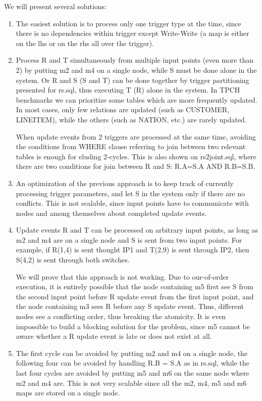 \documentclass{sig-semester}
\begin{document}
We will present several solutions:
\begin{enumerate}
\item The easiest solution is to process only one trigger type at the time, since there is no dependencies within trigger except Write-Write (a map is either on the lhs or on the rhs all over the trigger).
\item Process R and T simultaneously from multiple input points (even more than 2) by putting m2 and m4 on a single node, while S must be done alone in the system. Or R and S (S and T) can be done together by trigger partitioning presented for rs.sql, thus executing T (R) alone in the system. In TPCH benchmarks we can prioritize some tables which are more frequently updated. In most cases, only few relations are updated (such as CUSTOMER, LINEITEM), while the others (such as NATION, etc.) are rarely updated.

When update events from 2 triggers are processed at the same time, avoiding the conditions from WHERE clause referring to join between two relevant tables is enough for eluding 2-cycles. This is also shown on rs2joint.sql, where there are two conditions for join between R and S: R.A=S.A AND R.B=S.B.

\item An optimization of the previous approach is to keep track of currently processing trigger parameters, and let S in the system only if there are no conflicts. This is not scalable, since input points have to communicate with nodes and among themselves about completed update events.
\item Update events R and T can be processed on arbitrary input points, as long as m2 and m4 are on a single node and S is sent from two input points. For example, if R(1,4) is sent thought IP1 and T(2,9) is sent through IP2, then S(4,2) is sent through both switches.

We will prove that this approach is not working. Due to our-of-order execution, it is entirely possible that the node containing m5 first see S from the second input point before R update event from the first input point, and the node containing m3 sees R before any S update event. Thus, different nodes see a conflicting order, thus breaking the atomicity. It is even impossible to build a blocking solution for the problem, since m5 cannot be aware whether a R update event is late or does not exist at all.

\item The first cycle can be avoided by putting m2 and m4 on a single node, the following four can be avoided by handling R.B = S.A as in rs.sql, while the last four cycles are avoided by putting m5 and m6 on the same node where m2 and m4 are. This is not very scalable since all the m2, m4, m5 and m6 maps are stored on a single node.
\end{enumerate}
\end{document}

